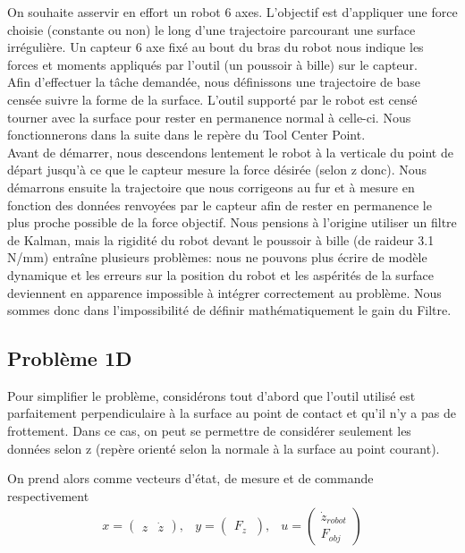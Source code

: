 \documentclass[12pt,twoside,a4paper]{article}
\begin{document}
On souhaite asservir en effort un robot 6 axes. L'objectif est d'appliquer une force choisie (constante ou non) le long d'une trajectoire parcourant une surface irrégulière. Un capteur 6 axe fixé au bout du bras du robot nous indique les forces et moments appliqués par l'outil (un poussoir à bille) sur le capteur. \\
Afin d'effectuer la tâche demandée, nous définissons une trajectoire de base censée suivre la forme de la surface. L'outil supporté par le robot est censé tourner avec la surface pour rester en permanence normal à celle-ci. Nous fonctionnerons dans la suite dans le repère du Tool Center Point.\\
 Avant de démarrer, nous descendons lentement le robot à la verticale du point de départ jusqu'à ce que le capteur mesure la force désirée (selon z donc). Nous démarrons ensuite la trajectoire que nous corrigeons au fur et à mesure en fonction des données renvoyées par le capteur afin de rester en permanence le plus proche possible de la force objectif. Nous pensions à l'origine utiliser un filtre de Kalman, mais la rigidité du robot devant le poussoir à bille (de raideur 3.1 N/mm) entraîne plusieurs problèmes: nous ne pouvons plus écrire de modèle dynamique et les erreurs sur la position du robot et les aspérités de la surface deviennent en apparence impossible à intégrer correctement au problème. Nous sommes donc dans l'impossibilité de définir mathématiquement le gain du Filtre.


\subsection{Problème 1D}

Pour simplifier le problème, considérons tout d'abord que l'outil utilisé est parfaitement perpendiculaire à la surface au point de contact et qu'il n'y a pas de frottement. Dans ce cas, on peut se permettre de considérer seulement les données selon z (repère orienté selon la normale à la surface au point courant).

On prend alors comme vecteurs d'état, de mesure et de commande respectivement
$$
\begin{array}{ccc}
x =  \begin{pmatrix} z & \dot{z} \end{pmatrix}
,   &
y= \begin{pmatrix}
 F_z \
\end{pmatrix},   &
u = \begin{pmatrix} \dot{z}_{robot} \\ F_{obj}\end{pmatrix} \\
\end{array}
$$
\end{document}
